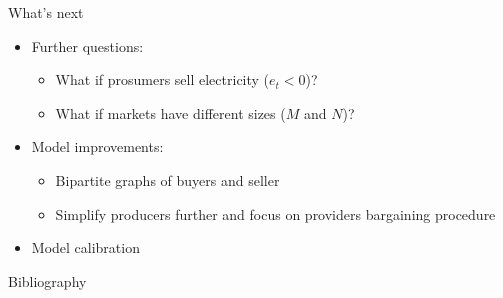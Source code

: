 \documentclass{beamer}
\begin{document}
\begin{frame}{What's next}
    \begin{itemize} \setlength\itemsep{1.5em}
        \item Further questions: \pause
              \begin{itemize} \setlength\itemsep{1em}
                  \item What if prosumers sell electricity ($e_t < 0$)? \pause
                  \item What if markets have different sizes ($M$ and $N$)? \pause
              \end{itemize}
        \item Model improvements: \pause
              \begin{itemize} \setlength\itemsep{1em}
                  \item Bipartite graphs of buyers and seller \pause
                  \item Simplify producers further and focus on providers bargaining procedure \pause
              \end{itemize}
        \item Model calibration
    \end{itemize}
\end{frame}


\begin{frame}[allowframebreaks]{Bibliography}
    \printbibliography
\end{frame}
\end{document}
